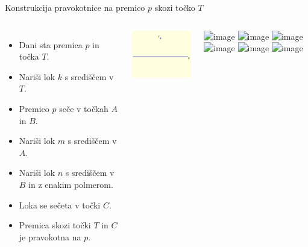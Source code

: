 \begin{frame}{Konstrukcija pravokotnice na premico $p$ skozi točko $T$}

		  
		  \begin{columns}
			\begin{itemize}
				 \item<1-> Dani sta premica $p$ in točka $T$.
				 \item<2-> Nariši lok $k$ s središčem v $T$.
				 \item<3-> Premico $p$ seče v točkah $A$ in $B$.
				 \item<4-> Nariši lok $m$ s središčem v $A$.
				 \item<5-> Nariši lok $n$ s središčem v $B$ in z enakim polmerom.
				 \item<6-> Loka se sečeta v točki $C$.
				 \item<7-> Premica skozi točki $T$ in $C$ je pravokotna na $p$.
			\end{itemize}
	
			  \centering
				\includegraphics[width=50mm]{slike/fig-1.png}%

			  \includegraphics<1>[width=50mm]{slike/fig-2.png}%
			  \includegraphics<2>[width=50mm]{slike/fig-3.png}%
			  \includegraphics<3>[width=50mm]{slike/fig-4.png}%
			  \includegraphics<4>[width=50mm]{slike/fig-5.png}%
			  \includegraphics<5>[width=50mm]{slike/fig-6.png}%
			  \includegraphics<6>[width=50mm]{slike/fig-7.png}%
		  \end{columns}

\end{frame}

